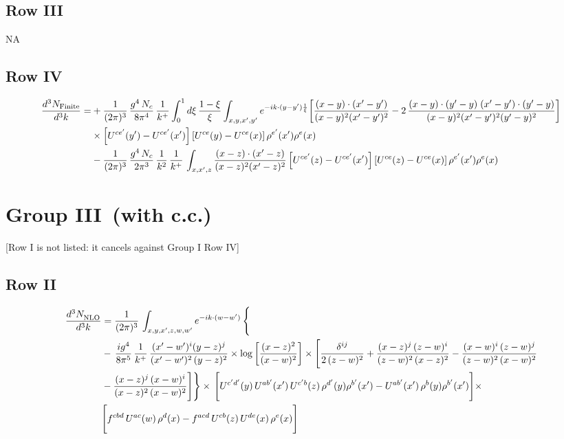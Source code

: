 \documentclass[9pt]{article}
\numberwithin{equation}{section}
\begin{document}
\subsection{Row III}
\textsc{NA}
\subsection{Row IV}
\begin{align}
\frac{d^{3}N_{\rm Finite}}{d^{3}k}= &  +\frac{1}{(2\pi)^{3}}\,\frac{g^{4}\,N_{c}}{8\pi^{4}}\,\frac{1}{k^{+}}\int_{0}^{1}d\xi\,\frac{1-\xi}{\xi}\int_{x,y,x',y'}e^{-ik\cdot(y-y')\frac{1}{\xi}}\bigg[\frac{(x-y)\cdot(x'-y')}{(x-y)^{2}(x'-y')^{2}}-2\,\frac{(x-y)\cdot(y'-y)\;(x'-y')\cdot(y'-y)}{(x-y)^{2}(x'-y')^{2}(y'-y)^{2}}\bigg]\notag\\
&\times\left[U^{ce'}(y') - U^{ce'}(x')\right]\left[U^{ce}(y) - U^{ce}(x)\right]\rho^{e'}(x')\rho^{e}(x)\notag \\ & -\frac{1}{(2\pi)^{3}}\,\frac{g^{4}\,N_{c}}{2\pi^{3}}\,\frac{1}{k^{2}}\,\frac{1}{k^{+}}\,\int_{x,x',z}\frac{(x-z)\cdot(x'-z)}{(x-z)^{2}(x'-z)^{2}}\left[U^{ce'}(z) - U^{ce'}(x')\right]\left[U^{ce}(z) - U^{ce}(x)\right]\rho^{e'}(x')\rho^{e}(x)
\end{align}
\section{Group III\, (with c.c.)} {\color{red}[Row I is not listed: it cancels against Group I Row IV]}\par\noindent
\subsection{Row II}
\begin{align}
     \frac{d^{3}N_{\rm NLO}^{\rm}}{d^{3}k}  & =   \frac{1}{(2\pi)^{3}}\, \int_{x,y,x',z,w,w^{\prime}} e^{-ik\cdot (w-w')}\, \Bigg\{\notag \\
& -\,\frac{ig^{4}}{8\pi^{5}}\,\frac{1}{k^{+}}\,\frac{(x'-w')^{i}(y-z)^{j}}{(x'-w')^{2}\,(y-z)^{2}}\times \log{\left[\frac{(x-z)^{2}}{(x-w)^{2}}\right]}\times \Bigg[\frac{\delta^{ij}}{2\,(z-w)^{2}}+\frac{(x-z)^{j}\,(z-w)^{i}}{(z-w)^{2}\,(x-z)^{2}} -\frac{(x-w)^{i}\,(z-w)^{j}}{(z-w)^{2}\,(x-w)^{2}}\notag \\ & -\frac{(x-z)^{j}\,(x-w)^{i}}{(x-z)^{2}\,(x-w)^{2}}\Bigg]\Bigg\}\times\,\Bigg[U^{c'd'}(y)\,U^{ab'}(x')\,U^{c'b}(z)\,\rho^{d'}(y)\rho^{b'}(x')-U^{ab'}(x')\,\rho^{b}(y)\rho^{b'}(x')\Bigg]\times\notag \\ & \Bigg[f^{cbd}\,U^{ac}(w)\,\rho^{d}(x)-f^{acd}\, U^{cb}(z)\,U^{de}(x)\,\rho^{e}(x)\Bigg]
\end{align}
\end{document}
